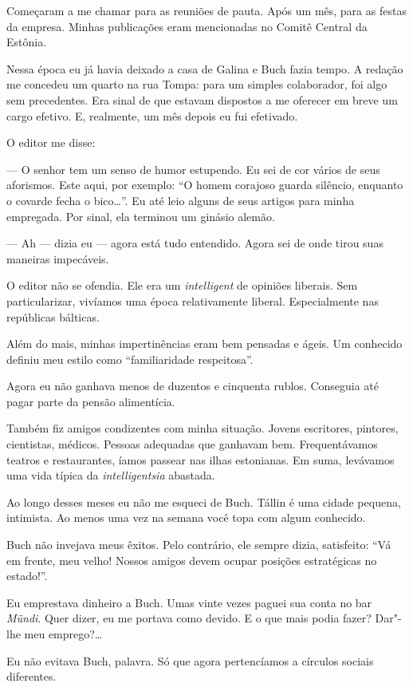 Começaram a me chamar para as reuniões de pauta. Após um mês, para as
festas da empresa. Minhas publicações eram mencionadas no Comitê Central
da Estônia.

Nessa época eu já havia deixado a casa de Galina e Buch fazia tempo. A
redação me concedeu um quarto na rua Tompa: para um simples colaborador,
foi algo sem precedentes. Era sinal de que estavam dispostos a me
oferecer em breve um cargo efetivo. E, realmente, um mês depois eu fui
efetivado.

O editor me disse:

--- O senhor tem um senso de humor estupendo. Eu sei de cor vários de
seus aforismos. Este aqui, por exemplo: ``O homem corajoso guarda
silêncio, enquanto o covarde fecha o bico\ldots{}''. Eu até leio alguns de
seus artigos para minha empregada. Por sinal, ela terminou um ginásio
alemão.

--- Ah --- dizia eu --- agora está tudo entendido. Agora sei de onde
tirou suas maneiras impecáveis.

O editor não se ofendia. Ele era um \emph{intelligent} de opiniões
liberais. Sem particularizar, vivíamos uma época relativamente liberal.
Especialmente nas repúblicas bálticas.

Além do mais, minhas impertinências eram bem pensadas e ágeis. Um
conhecido definiu meu estilo como ``familiaridade respeitosa''.

Agora eu não ganhava menos de duzentos e cinquenta rublos. Conseguia até
pagar parte da pensão alimentícia.

Também fiz amigos condizentes com minha situação. Jovens escritores,
pintores, cientistas, médicos. Pessoas adequadas que ganhavam bem.
Frequentávamos teatros e restaurantes, íamos passear nas ilhas
estonianas. Em suma, levávamos uma vida típica da \emph{intelligentsia}
abastada.

Ao longo desses meses eu não me esqueci de Buch. Tállin é uma cidade
pequena, intimista. Ao menos uma vez na semana você topa com algum
conhecido.

Buch não invejava meus êxitos. Pelo contrário, ele sempre dizia,
satisfeito: ``Vá em frente, meu velho! Nossos amigos devem ocupar
posições estratégicas no estado!''. %

Eu emprestava dinheiro a Buch. Umas vinte vezes paguei sua conta no bar
\emph{Mündi}. Quer dizer, eu me portava como devido. E o que mais podia
fazer? Dar"-lhe meu emprego?\ldots{}

Eu não evitava Buch, palavra. Só que agora pertencíamos a círculos
sociais diferentes.

